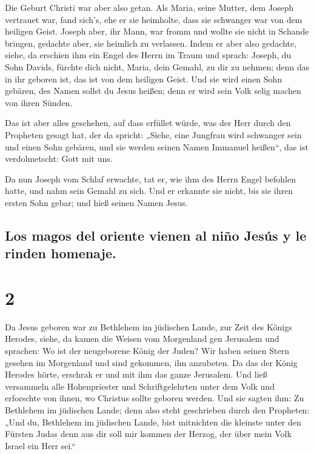  Die Geburt Christi war aber also getan. Als Maria, seine
Mutter, dem Joseph vertrauet war, fand sich's, ehe er sie heimholte,
dass sie schwanger war von dem heiligen Geist.  Joseph
aber, ihr Mann, war fromm und wollte sie nicht in Schande bringen,
gedachte aber, sie heimlich zu verlassen.  Indem er aber
also gedachte, siehe, da erschien ihm ein Engel des Herrn im Traum und
sprach: Joseph, du Sohn Davids, fürchte dich nicht, Maria, dein Gemahl,
zu dir zu nehmen; denn das in ihr geboren ist, das ist von dem heiligen
Geist.  Und sie wird einen Sohn gebären, des Namen sollst
du Jesus heißen; denn er wird sein Volk selig machen von ihren Sünden.

 Das ist aber alles geschehen, auf dass erfüllet würde,
was der Herr durch den Propheten gesagt hat, der da spricht:
 „Siehe, eine Jungfrau wird schwanger sein und einen Sohn
gebären, und sie werden seinen Namen Immanuel heißen``, das ist
verdolmetscht: Gott mit uns.

 Da nun Joseph vom Schlaf erwachte, tat er, wie ihm des
Herrn Engel befohlen hatte, und nahm sein Gemahl zu sich.
 Und er erkannte sie nicht, bis sie ihren ersten Sohn
gebar; und hieß seinen Namen Jesus.

\hypertarget{los-magos-del-oriente-vienen-al-niuxf1o-jesuxfas-y-le-rinden-homenaje.}{%
\subsection{Los magos del oriente vienen al niño Jesús y le rinden
homenaje.}\label{los-magos-del-oriente-vienen-al-niuxf1o-jesuxfas-y-le-rinden-homenaje.}}

\hypertarget{section-1}{%
\section{2}\label{section-1}}

 Da Jesus geboren war zu Bethlehem im jüdischen Lande, zur
Zeit des Königs Herodes, siehe, da kamen die Weisen vom Morgenland gen
Jerusalem und sprachen:  Wo ist der neugeborene König der
Juden? Wir haben seinen Stern gesehen im Morgenland und sind gekommen,
ihn anzubeten.  Da das der König Herodes hörte, erschrak
er und mit ihm das ganze Jerusalem.  Und ließ versammeln
alle Hohenpriester und Schriftgelehrten unter dem Volk und erforschte
von ihnen, wo Christus sollte geboren werden.  Und sie
sagten ihm: Zu Bethlehem im jüdischen Lande; denn also steht geschrieben
durch den Propheten:  „Und du, Bethlehem im jüdischen
Lande, bist mitnichten die kleinste unter den Fürsten Judas denn aus dir
soll mir kommen der Herzog, der über mein Volk Israel ein Herr sei.``

